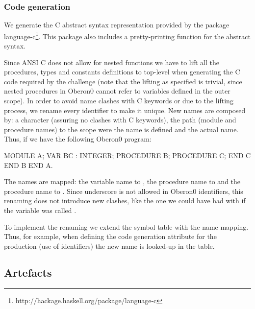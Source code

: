 \subsubsection{Code generation}

We generate the C abstract syntax representation provided by the package language-c\footnote{http://hackage.haskell.org/package/language-c}.
This package also includes a pretty-printing function for the abstract syntax.

Since ANSI C does not allow for nested functions  we have to lift  all the procedures, 
types and constants definitions to top-level when generating the C code required by the challenge (note that  the lifting as specified is trivial, 
since nested procedures in Oberon0 cannot refer to variables defined in the outer scope).%
In order to avoid name clashes with C keywords or due to the lifting process, we rename every identifier to make it unique.  
New names are composed by: a character  (assuring no clashes with C keywords),
the path (module and procedure names) to the scope were the name is defined and the actual name. 
Thus, if we have the following Oberon0 program:
\begin{oberon0}
MODULE A;
  VAR BC : INTEGER;
  PROCEDURE B;
    PROCEDURE C;
    END C
  END B
END A.
\end{oberon0}
The names are mapped: the variable name  to ,
the procedure name  to  and
the procedure name  to .
Since underscore is not allowed in Oberon0 identifiers, 
this renaming does not introduce new clashes, 
like the one we could have had with  if the variable 
 was called .


To implement the renaming we extend the symbol table with the name mapping.
Thus, for example, when defining the code generation attribute for the
production  (use of identifiers) the new name is looked-up in the table.

\subsection{Artefacts}

